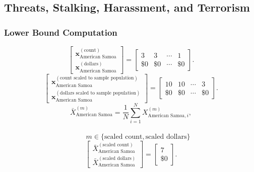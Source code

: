\subsection{Threats, Stalking, Harassment, and Terrorism}
\subsubsection{Lower Bound Computation}
\[
\begin{bmatrix}
\mathbf{x}_{\text{American Samoa}}^{(\text{count})}\\
\mathbf{x}_{\text{American Samoa}}^{(\text{dollars})}
\end{bmatrix}
=
\begin{bmatrix}
3 & 3 & \cdots & 1\\
\$0 &\$0 & \cdots &\$0 
\end{bmatrix}.
\]
\[
\begin{bmatrix}
\mathbf{x}_{\text{American Samoa}}^{(\text{count scaled to sample population})}\\
\mathbf{x}_{\text{American Samoa}}^{(\text{dollars scaled to sample population})}
\end{bmatrix}
=
\begin{bmatrix}
10 & 10 & \cdots & 3\\
\$0 &\$0 & \cdots &\$0 
\end{bmatrix}.
\]
  \[
\bar{X}_{\text{American Samoa}}^{(m)}
= \frac{1}{N}\sum_{i=1}^{N} X_{\text{American Samoa},i}^{(m)},
\]
\\
\[
\qquad
m \in \{\text{scaled count},\text{scaled dollars}\}
\]
\[
\begin{bmatrix}
\bar{X}_{\text{American Samoa}}^{(\text{scaled count})}\\
\bar{X}_{\text{American Samoa}}^{(\text{scaled dollars})}
\end{bmatrix}
=
\begin{bmatrix}
7\\
\$0
\end{bmatrix}.
\]

